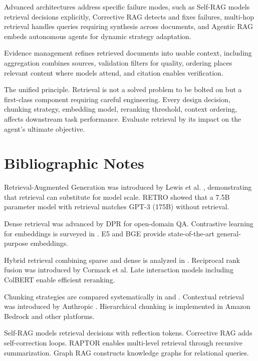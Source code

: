 Advanced architectures address specific failure modes, such as Self-RAG models retrieval decisions explicitly, Corrective RAG detects and fixes failures, multi-hop retrieval handles queries requiring synthesis across documents, and Agentic RAG embeds autonomous agents for dynamic strategy adaptation.

Evidence management refines retrieved documents into usable context, including aggregation combines sources, validation filters for quality, ordering places relevant content where models attend, and citation enables verification.

The unified principle. Retrieval is not a solved problem to be bolted on but a first-class component requiring careful engineering. Every design decision, chunking strategy, embedding model, reranking threshold, context ordering, affects downstream task performance. Evaluate retrieval by its impact on the agent's ultimate objective.

\section*{Bibliographic Notes}

Retrieval-Augmented Generation was introduced by Lewis et al. \cite{lewis2020rag}, demonstrating that retrieval can substitute for model scale. RETRO \cite{retro2022} showed that a 7.5B parameter model with retrieval matches GPT-3 (175B) without retrieval.

Dense retrieval was advanced by DPR \cite{dpr2020} for open-domain QA. Contrastive learning for embeddings is surveyed in \cite{embeddingsurvey}. E5 \cite{e5} and BGE provide state-of-the-art general-purpose embeddings.

Hybrid retrieval combining sparse and dense is analyzed in \cite{hybridrag2025}. Reciprocal rank fusion was introduced by Cormack et al. Late interaction models including ColBERT \cite{colbert} enable efficient reranking.

Chunking strategies are compared systematically in \cite{chunkstudy2025} and \cite{chunkeval2026}. Contextual retrieval was introduced by Anthropic \cite{anthropic2024contextual}. Hierarchical chunking is implemented in Amazon Bedrock and other platforms.

Self-RAG \cite{selfrag} models retrieval decisions with reflection tokens. Corrective RAG \cite{crag} adds self-correction loops. RAPTOR \cite{raptor} enables multi-level retrieval through recursive summarization. Graph RAG \cite{graphrag} constructs knowledge graphs for relational queries.

